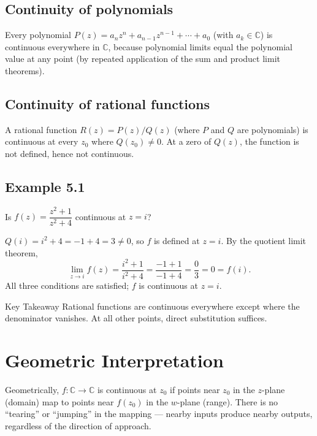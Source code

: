 \documentclass[12pt,a4paper]{article}
\begin{document}
\subsection*{Continuity of polynomials}

Every polynomial $P(z) = a_n z^n + a_{n-1}z^{n-1} + \cdots + a_0$
(with $a_k \in \mathbb{C}$) is continuous everywhere in $\mathbb{C}$,
because polynomial limits equal the polynomial value at any point
(by repeated application of the sum and product limit theorems).

\subsection*{Continuity of rational functions}

A rational function $R(z) = P(z)/Q(z)$ (where $P$ and $Q$ are polynomials) is
continuous at every $z_0$ where $Q(z_0) \neq 0$.
At a zero of $Q(z)$, the function is not defined, hence not continuous.

\subsection*{Example 5.1}

Is $f(z) = \dfrac{z^2 + 1}{z^2 + 4}$ continuous at $z = i$?

$Q(i) = i^2 + 4 = -1 + 4 = 3 \neq 0$, so $f$ is defined at $z = i$.
By the quotient limit theorem,
\[
  \lim_{z \to i} f(z) = \frac{i^2 + 1}{i^2 + 4} = \frac{-1+1}{-1+4} = \frac{0}{3} = 0 = f(i).
\]
All three conditions are satisfied; $f$ is continuous at $z = i$.

\begin{learnbox}{Key Takeaway}
Rational functions are continuous everywhere except where the denominator
vanishes.  At all other points, direct substitution suffices.
\end{learnbox}

\section{Geometric Interpretation}

Geometrically, $f: \mathbb{C} \to \mathbb{C}$ is continuous at $z_0$ if
points near $z_0$ in the $z$-plane (domain) map to points near $f(z_0)$
in the $w$-plane (range).  There is no ``tearing'' or ``jumping'' in the
mapping --- nearby inputs produce nearby outputs, regardless of the
direction of approach.
\end{document}
